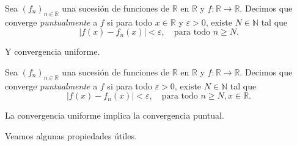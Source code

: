\begin{definition}
	Sea $(f_n)_{n \in \mathbb{R}}$ una sucesión de funciones de $\mathbb{R}$ en $\mathbb{R}$ y $f : \mathbb{R} \to \mathbb{R}$. Decimos que converge \emph{puntualmente} a $f$ si para todo $x \in \mathbb{R}$ y $\varepsilon > 0$, existe $N \in \mathbb{N}$ tal que
	\begin{equation*}
		\left\lvert f(x) - f_n(x) \right\rvert < \varepsilon, \quad \text{para todo }n \geq N.
	\end{equation*}
\end{definition}

Y convergencia uniforme.

\begin{definition}
	Sea $(f_n)_{n \in \mathbb{R}}$ una sucesión de funciones de $\mathbb{R}$ en $\mathbb{R}$ y $f : \mathbb{R} \to \mathbb{R}$. Decimos que converge \emph{puntualmente} a $f$ si para todo $\varepsilon > 0$, existe $N \in \mathbb{N}$ tal que
	\begin{equation*}
		\left\lvert f(x) - f_n(x) \right\rvert < \varepsilon, \quad \text{para todo }n \geq N, x \in \mathbb{R}.
	\end{equation*}
\end{definition}

\begin{remark}
	La convergencia uniforme implica la convergencia puntual.
\end{remark}

Veamos algunas propiedades útiles.

